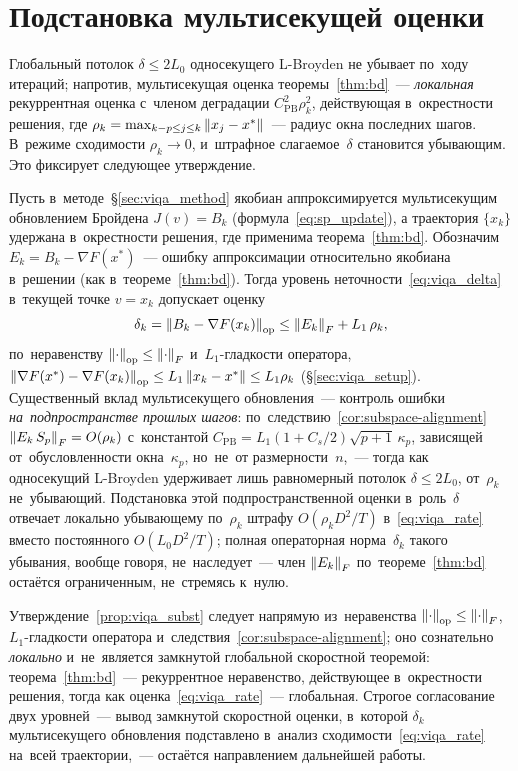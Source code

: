 \section{Подстановка мультисекущей оценки}\label{sec:viqa_subst}

Глобальный потолок $\delta\le 2L_0$ односекущего L-Broyden не
убывает по~ходу итераций; напротив, мультисекущая оценка
теоремы~\ref{thm:bd}~--- \emph{локальная} рекуррентная оценка с~членом
деградации $C_{\mathrm{PB}}^2\rho_k^2$, действующая в~окрестности решения,
где $\rho_k=\max_{k-p\le j\le k}\left\|x_j-x^*\right\|$~--- радиус окна последних
шагов. В~режиме сходимости $\rho_k\to0$, и~штрафное слагаемое~$\delta$
становится убывающим. Это фиксирует следующее утверждение.

\begin{proposition}\label{prop:viqa_subst}
Пусть в~методе~\S\ref{sec:viqa_method} якобиан аппроксимируется
мультисекущим обновлением Бройдена $J(v)=B_k$ (формула~\eqref{eq:sp_update}), а
траектория $\{x_k\}$ удержана в~окрестности решения, где применима
теорема~\ref{thm:bd}. Обозначим $E_k = B_k - \nabla F(x^*)$~--- ошибку
аппроксимации относительно якобиана в~решении (как в~теореме~\ref{thm:bd}).
Тогда уровень неточности~\eqref{eq:viqa_delta} в~текущей точке $v=x_k$
допускает оценку
\[
  \delta_k = \left\|B_k-\nabla F(x_k)\right\|_{\mathrm{op}}
           \le \left\|E_k\right\|_F + L_1\,\rho_k,
\]
по~неравенству $\left\|\cdot\right\|_{\mathrm{op}}\le\left\|\cdot\right\|_F$ и~$L_1$-гладкости
оператора, $\left\|\nabla F(x^*)-\nabla F(x_k)\right\|_{\mathrm{op}}\le L_1\left\|x_k-x^*\right\|
\le L_1\rho_k$ (\S\ref{sec:viqa_setup}). Существенный вклад мультисекущего
обновления~--- контроль ошибки \emph{на~подпространстве прошлых шагов}:
по~следствию~\ref{cor:subspace-alignment} $\left\|E_k\,S_p\right\|_F = O(\rho_k)$
с~константой $C_{\mathrm{PB}}=L_1(1{+}C_s/2)\sqrt{p+1}\,\kappa_p$, зависящей
от~обусловленности окна~$\kappa_p$, но~не~от размерности~$n$,~--- тогда как
односекущий L-Broyden удерживает лишь равномерный потолок $\delta\le 2L_0$,
от~$\rho_k$ не~убывающий. Подстановка этой подпространственной оценки
в~роль~$\delta$ отвечает локально убывающему по~$\rho_k$ штрафу
$O(\rho_k D^2/T)$ в~\eqref{eq:viqa_rate} вместо постоянного $O(L_0 D^2/T)$;
полная операторная норма~$\delta_k$ такого убывания, вообще говоря,
не~наследует~--- член $\left\|E_k\right\|_F$ по~теореме~\ref{thm:bd} остаётся
ограниченным, не~стремясь к~нулю.
\end{proposition}

\noindent
Утверждение~\ref{prop:viqa_subst} следует напрямую из~неравенства
$\left\|\cdot\right\|_{\mathrm{op}}\le\left\|\cdot\right\|_F$, $L_1$-гладкости оператора
и~следствия~\ref{cor:subspace-alignment};
оно сознательно \emph{локально} и~не~является замкнутой глобальной
скоростной теоремой: теорема~\ref{thm:bd}~--- рекуррентное неравенство,
действующее в~окрестности решения, тогда как
оценка~\eqref{eq:viqa_rate}~--- глобальная. Строгое согласование двух
уровней~--- вывод замкнутой скоростной оценки, в~которой $\delta_k$
мультисекущего обновления подставлено в~анализ
сходимости~\eqref{eq:viqa_rate} на~всей траектории,~--- остаётся
направлением дальнейшей работы.

